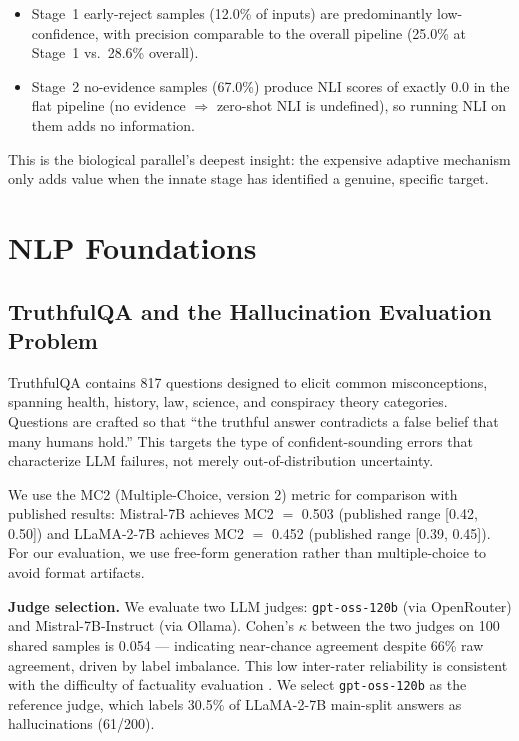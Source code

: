\documentclass[11pt,a4paper]{article}
\begin{document}
\begin{itemize}
\item Stage~1 early-reject samples (12.0\% of inputs) are predominantly
      low-confidence, with precision comparable to the overall pipeline (25.0\%
      at Stage~1 vs.\ 28.6\% overall).
\item Stage~2 no-evidence samples (67.0\%) produce NLI scores of exactly 0.0
      in the flat pipeline (no evidence $\Rightarrow$ zero-shot NLI is
      undefined), so running NLI on them adds no information.
\end{itemize}

This is the biological parallel's deepest insight: the expensive adaptive
mechanism only adds value when the innate stage has identified a genuine,
specific target.

\section{NLP Foundations}
\label{sec:nlp}

\subsection{TruthfulQA and the Hallucination Evaluation Problem}

TruthfulQA \citep{lin2022truthfulqa} contains 817 questions designed to elicit
common misconceptions, spanning health, history, law, science, and conspiracy
theory categories. Questions are crafted so that ``the truthful answer
contradicts a false belief that many humans hold.'' This targets the type of
confident-sounding errors that characterize LLM failures, not merely
out-of-distribution uncertainty.

We use the MC2 (Multiple-Choice, version 2) metric for comparison with published
results: Mistral-7B achieves MC2 $=$ 0.503 (published range [0.42, 0.50]) and
LLaMA-2-7B achieves MC2 $=$ 0.452 (published range [0.39, 0.45]). For our
evaluation, we use free-form generation rather than multiple-choice to avoid
format artifacts.

\textbf{Judge selection.} We evaluate two LLM judges: \texttt{gpt-oss-120b}
(via OpenRouter) and Mistral-7B-Instruct (via Ollama). Cohen's $\kappa$ between
the two judges on 100 shared samples is 0.054 --- indicating near-chance
agreement despite 66\% raw agreement, driven by label imbalance. This low
inter-rater reliability is consistent with the difficulty of factuality
evaluation \citep{wang2023chatgpt}. We select \texttt{gpt-oss-120b} as the
reference judge, which labels 30.5\% of LLaMA-2-7B main-split answers as
hallucinations (61/200).
\end{document}
